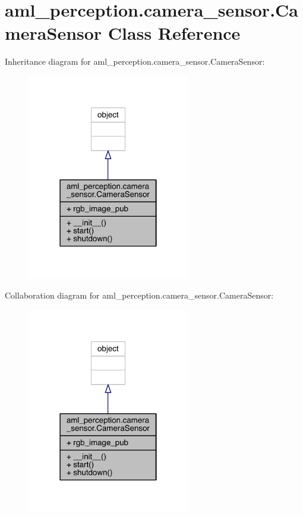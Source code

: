 \hypertarget{classaml__perception_1_1camera__sensor_1_1_camera_sensor}{}\section{aml\+\_\+perception.\+camera\+\_\+sensor.\+Camera\+Sensor Class Reference}
\label{classaml__perception_1_1camera__sensor_1_1_camera_sensor}


Inheritance diagram for aml\+\_\+perception.\+camera\+\_\+sensor.\+Camera\+Sensor\+:
\nopagebreak
\begin{figure}[H]
\begin{center}
\leavevmode
\includegraphics[width=201pt]{classaml__perception_1_1camera__sensor_1_1_camera_sensor__inherit__graph}
\end{center}
\end{figure}


Collaboration diagram for aml\+\_\+perception.\+camera\+\_\+sensor.\+Camera\+Sensor\+:
\nopagebreak
\begin{figure}[H]
\begin{center}
\leavevmode
\includegraphics[width=201pt]{classaml__perception_1_1camera__sensor_1_1_camera_sensor__coll__graph}
\end{center}
\end{figure}
